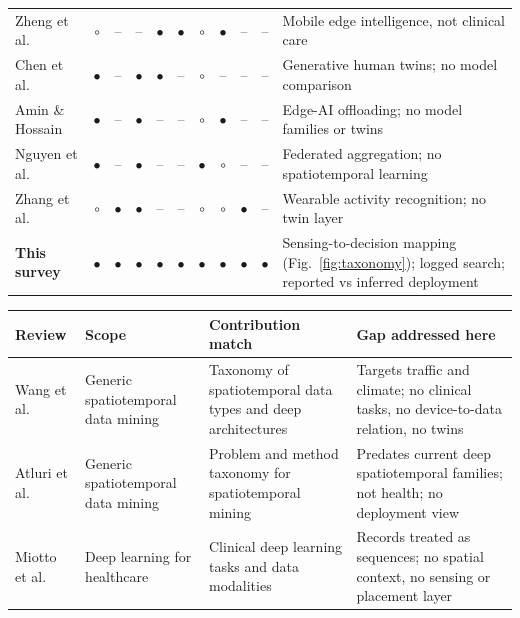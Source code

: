 \documentclass[journal]{IEEEtran}
\begin{document}
\begin{table}[t]
\begin{tabularx}{\textwidth}{>{\raggedright\arraybackslash}p{2.7cm} c c c c c c c c c >{\raggedright\arraybackslash}X}
\rowcolor{tablestripe}Zheng et al.~\cite{Zheng2026DTtoWM} & $\circ$ & -- & -- & $\bullet$ & $\bullet$ & $\circ$ & $\bullet$ & -- & -- & Mobile edge intelligence, not clinical care \\
\addlinespace[1pt]
Chen et al.~\cite{chen2024genaitwin} & $\bullet$ & -- & $\bullet$ & $\bullet$ & -- & $\circ$ & -- & -- & -- & Generative human twins; no model comparison \\
\addlinespace[1pt]
\rowcolor{tablestripe}Amin \& Hossain~\cite{amin2021edgeintel} & $\bullet$ & -- & $\bullet$ & -- & -- & $\circ$ & $\bullet$ & -- & -- & Edge-AI offloading; no model families or twins \\
\addlinespace[1pt]
Nguyen et al.~\cite{nguyen2022FLsmarthealthcare} & $\bullet$ & -- & $\bullet$ & -- & -- & $\bullet$ & $\circ$ & -- & -- & Federated aggregation; no spatiotemporal learning \\
\addlinespace[1pt]
\rowcolor{tablestripe}Zhang et al.~\cite{zhang2022harreview} & $\circ$ & $\bullet$ & $\bullet$ & -- & -- & $\circ$ & $\circ$ & $\bullet$ & -- & Wearable activity recognition; no twin layer \\
\addlinespace[1pt]
\textbf{This survey} & $\bullet$ & $\bullet$ & $\bullet$ & $\bullet$ & $\bullet$ & $\bullet$ & $\bullet$ & $\bullet$ & $\bullet$ & Sensing-to-decision mapping (Fig.~\ref{fig:taxonomy}); logged search; reported vs inferred deployment \\
\bottomrule
\end{tabularx}
\else
\footnotesize
\setlength{\tabcolsep}{4pt}
\renewcommand{\arraystretch}{1.1}
\begin{tabularx}{\textwidth}{>{\raggedright\arraybackslash}p{2.5cm} >{\raggedright\arraybackslash}p{2.6cm} >{\raggedright\arraybackslash}X >{\raggedright\arraybackslash}X}
\toprule
\textbf{Review} & \textbf{Scope} & \textbf{Contribution match} & \textbf{Gap addressed here} \\
\midrule
Wang et al.~\cite{wang2022deep} & Generic spatiotemporal data mining & Taxonomy of spatiotemporal data types and deep architectures & Targets traffic and climate; no clinical tasks, no device-to-data relation, no twins \\
\addlinespace[2pt]
\rowcolor{tablestripe}Atluri et al.~\cite{atluri2018stdm} & Generic spatiotemporal data mining & Problem and method taxonomy for spatiotemporal mining & Predates current deep spatiotemporal families; not health; no deployment view \\
\addlinespace[2pt]
Miotto et al.~\cite{miotto2018deeplearning} & Deep learning for healthcare & Clinical deep learning tasks and data modalities & Records treated as sequences; no spatial context, no sensing or placement layer \\

\end{tabularx}
\end{table}
\end{document}
